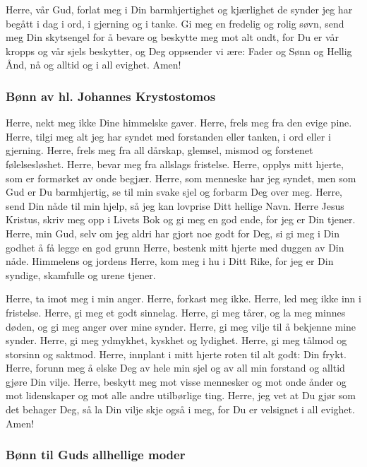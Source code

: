 Herre, vår Gud, forlat meg i Din barmhjertighet og kjærlighet de synder jeg har begått i dag i ord, i gjerning og i tanke. Gi meg en fredelig og rolig søvn, send meg Din skytsengel for å bevare og beskytte meg mot alt ondt, for Du er vår kropps og vår sjels beskytter, og Deg oppsender vi ære: Fader og Sønn og Hellig Ånd, nå og alltid og i all evighet. Amen!

\subsubsection{Bønn av hl. Johannes Krystostomos}
    
Herre, nekt meg ikke Dine himmelske gaver. Herre, frels meg fra den evige pine. Herre, tilgi meg alt jeg har syndet med forstanden eller tanken, i ord eller i gjerning. Herre, frels meg fra all dårskap, glemsel, mismod og forstenet følelsesløshet. Herre, bevar meg fra allslags fristelse. Herre, opplys mitt hjerte, som er formørket av onde begjær. Herre, som menneske har jeg syndet, men som Gud er Du barmhjertig, se til min svake sjel og forbarm Deg over meg. Herre, send Din nåde til min hjelp, så jeg kan lovprise Ditt hellige Navn. Herre Jesus Kristus, skriv meg opp i Livets Bok og gi meg en god ende, for jeg er Din tjener. Herre, min Gud, selv om jeg aldri har gjort noe godt for Deg, si gi meg i Din godhet å få legge en god grunn Herre, bestenk mitt hjerte med duggen av Din nåde. Himmelens og jordens Herre, kom meg i hu i Ditt Rike, for jeg er Din syndige, skamfulle og urene tjener.

Herre, ta imot meg i min anger. Herre, forkast meg ikke. Herre, led meg ikke inn i fristelse. Herre, gi meg et godt sinnelag. Herre, gi meg tårer, og la meg minnes døden, og gi meg anger over mine synder. Herre, gi meg vilje til å bekjenne mine synder. Herre, gi meg ydmykhet, kyskhet og lydighet. Herre, gi meg tålmod og storsinn og saktmod. Herre, innplant i mitt hjerte roten til alt godt: Din frykt. Herre, forunn meg å elske Deg av hele min sjel og av all min forstand og alltid gjøre Din vilje. Herre, beskytt meg mot visse mennesker og mot onde ånder og mot lidenskaper og mot alle andre utilbørlige ting. Herre, jeg vet at Du gjør som det behager Deg, så la Din vilje skje også i meg, for Du er velsignet i all evighet. Amen!

\subsubsection{Bønn til Guds allhellige moder}

